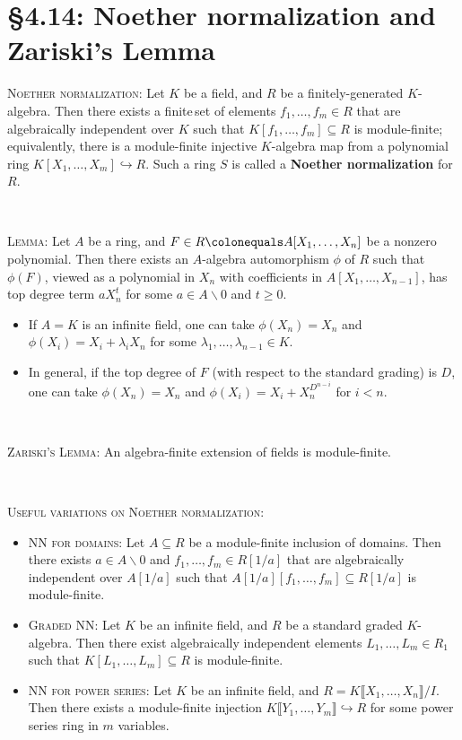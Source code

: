 \documentclass[12pt]{amsart}
\newcommand{\1}{\mathbbm{1}}
\newcommand{\showsol}[1]{\def\displaysol{#1}}
\newcommand\ceq{\colonequals}
\begin{document}
\showsol{1}
	
	\thispagestyle{empty}
	
	\section*{\S4.14: Noether normalization and Zariski's Lemma}	

\begin{framed}

\noindent \textsc{Noether normalization:} Let $K$ be a field, and $R$ be a finitely-generated $K$-algebra. Then there exists a finite\footnotemark\,set of elements $f_1,\dots,f_m\in R$ that are algebraically independent over $K$ such that $K[f_1,\dots,f_m] \subseteq R$ is module-finite; equivalently, there is a module-finite injective $K$-algebra map from a polynomial ring ${K[X_1,\dots,X_m] \hookrightarrow R}$. Such a ring $S$ is called a \textbf{Noether normalization} for~$R$.

\

\noindent \textsc{Lemma:} Let $A$ be a ring, and $F \in R \ceq A[X_1,\dots,X_n]$ be a nonzero polynomial. Then there exists an $A$-algebra automorphism $\phi$ of $R$ such that $\phi(F)$, viewed as a polynomial in $X_n$ with coefficients in $A[X_1,\dots, X_{n-1}]$, has top degree term $a X_n^t$ for some $a\in A\smallsetminus 0$ and $t\geq 0$.
\begin{itemize}
\item If $A=K$ is an infinite field, one can take $\phi(X_n)=X_n$ and $\phi(X_i) = X_i +\lambda_i X_n$ for some $\lambda_1,\dots,\lambda_{n-1} \in K$.
\item In general, if the top degree of $F$ (with respect to the standard grading) is $D$, one can take $\phi(X_n) = X_n$ and $\phi(X_i) = X_i + X_n^{D^{n-i}}$ for $i<n$.
\end{itemize}

\


\noindent \textsc{Zariski's Lemma:} An algebra-finite extension of fields is module-finite.

\

\noindent \textsc{Useful variations on Noether normalization:}
\begin{itemize}
\item \textsc{NN for domains:} Let $A\subseteq R$ be a module-finite inclusion of domains\footnotemark. Then there exists $a\in A\smallsetminus 0$ and $f_1,\dots,f_m\in R[1/a]$ that are algebraically independent over $A[1/a]$ such that $A[1/a][f_1,\dots,f_m] \subseteq R[1/a]$ is module-finite.
\item \textsc{Graded NN:} Let $K$ be an infinite field, and $R$ be a standard graded $K$-algebra. Then there exist algebraically independent elements $L_1,\dots,L_m \in R_1$ such that $K[L_1,\dots,L_m] \subseteq R$ is module-finite.
\item \textsc{NN for power series:} Let $K$ be an infinite field, and $R=K\llbracket X_1,\dots,X_n \rrbracket / I$. Then there exists a module-finite injection $K\llbracket Y_1,\dots,Y_m \rrbracket \hookrightarrow R$ for some power series ring in $m$ variables.
\end{itemize}

 \end{framed}
\end{document}
